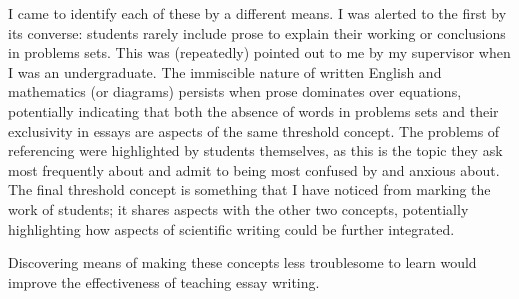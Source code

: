 I came to identify each of these by a different means. I was alerted to the first by its converse: students rarely include prose to explain their working or conclusions in problems sets. This was (repeatedly) pointed out to me by my supervisor when I was an undergraduate. The immiscible nature of written English and mathematics (or diagrams) persists when prose dominates over equations, potentially indicating that both the absence of words in problems sets and their exclusivity in essays are aspects of the same threshold concept. The problems of referencing were highlighted by students themselves, as this is the topic they ask most frequently about and admit to being most confused by and anxious about. The final threshold concept is something that I have noticed from marking the work of students; it shares aspects with the other two concepts, potentially highlighting how aspects of scientific writing could be further integrated.

Discovering means of making these concepts less troublesome to learn would improve the effectiveness of teaching essay writing.
